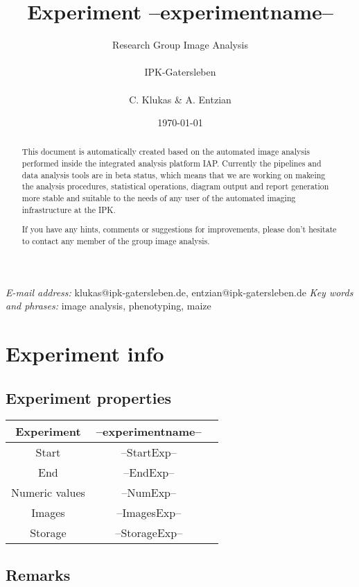 \documentclass[%
  paper=a4, %
  pagesize, %
  DIV=calc, %
  headings=small,%
  english,   %
  oneside
]{scrartcl}  %
\providecommand{\tabularnewline}{\\}
\begin{document}
\title{Experiment --experimentname--}
\author{Research Group Image Analysis\\ \\ IPK-Gatersleben\\ \\ C. Klukas \& A. Entzian}
\date{\today}

\maketitle  
\begin{abstract}
This document is automatically created based on the automated image analysis performed 
inside the integrated analysis platform IAP. Currently the pipelines and data analysis tools are in beta status, 
which means that we are working on makeing the analysis procedures, statistical operations, diagram output and report
generation more stable and suitable to the needs of any user of the automated imaging infrastructure at the IPK.

If you have any hints, comments or suggestions for improvements, please don't hesitate to contact any member
of the group image analysis.
\end{abstract}
\vfill
\small{\textit{E-mail address:} klukas@ipk-gatersleben.de, entzian@ipk-gatersleben.de}
\newline 
\small{\textit{Key words and phrases:} image analysis, phenotyping, maize }
 

\clearpage
\tableofcontents

\clearpage
\pagestyle{headings}
\section{Experiment info} 
\subsection{Experiment properties}


\begin{tabular}{|c|c|c|}
\hline 
Experiment & --experimentname--\tabularnewline
\hline 
\hline 
Start & --StartExp--\tabularnewline
\hline 
End & --EndExp--\tabularnewline
\hline 
Numeric values & --NumExp-- \tabularnewline
\hline 
Images & --ImagesExp-- \tabularnewline
\hline 
Storage & --StorageExp-- \tabularnewline
\hline 
\end{tabular}


\subsection{Remarks}
\end{document}
